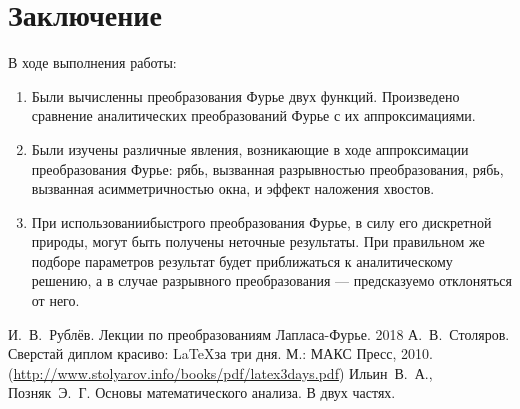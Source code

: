 \documentclass[a4paper, 11pt]{article}
\begin{document}
\section{Заключение}
    В ходе выполнения работы:
    \begin{enumerate}
        \item
            Были вычисленны преобразования Фурье двух функций. Произведено сравнение аналитических преобразований Фурье с их аппроксимациями.
        \item
            Были изучены различные явления, возникающие в ходе аппроксимации преобразования Фурье: рябь, вызванная разрывностью преобразования, рябь, вызванная асимметричностью окна, и эффект наложения хвостов.
        \item
            При использованиибыстрого преобразования Фурье, в силу его дискретной природы, могут быть получены неточные результаты. При правильном же подборе параметров результат будет приближаться к аналитическому решению, а в случае разрывного преобразования --- предсказуемо отклоняться от него.
    \end{enumerate}
\begin{thebibliography}{99}
	 И.~В.~Рублёв. Лекции по преобразованиям Лапласа-Фурье. 2018
	 А.~В.~Столяров. Сверстай диплом красиво: \LaTeX за три дня. М.: МАКС Пресс, 2010. (\url{http://www.stolyarov.info/books/pdf/latex3days.pdf})
	Ильин~В.~А., Позняк~Э.~Г. Основы математического анализа. В двух частях.
\end{thebibliography}
    
\end{document}
